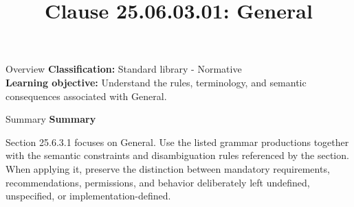 \documentclass[10pt,letterpaper]{article}
\title{Clause 25.06.03.01: General}
\author{}
\date{}
\begin{document}
\maketitle
\begin{CornellOverviewBox}{Overview}
\textbf{Classification:} Standard library - Normative\\[2pt]
\textbf{Learning objective:} Understand the rules, terminology, and semantic consequences associated with General.
\end{CornellOverviewBox}\begin{CornellSummaryBox}{Summary}
{\sffamily\bfseries\color{Accent} Summary}\par\vspace{3pt}Section 25.6.3.1 focuses on General. Use the listed grammar productions together with the semantic constraints and disambiguation rules referenced by the section. When applying it, preserve the distinction between mandatory requirements, recommendations, permissions, and behavior deliberately left undefined, unspecified, or implementation-defined.
\end{CornellSummaryBox}
\end{document}
